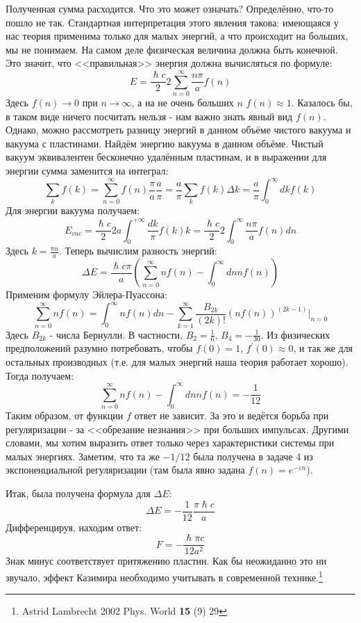\documentclass[a4paper,12pt]{article}
\begin{document}
\noindent
Полученная сумма расходится. Что это может означать? Определённо, что-то пошло не так. Стандартная интерпретация этого явления такова: имеющаяся у нас теория применима только для малых энергий, а что происходит на больших, мы не понимаем. На самом деле физическая величина должна быть конечной. Это значит, что <<правильная>> энергия должна вычисляться по формуле:
$$
E=\frac{\hslash c}{2}2\sum_{n=0}^{\infty}\frac{n\pi}{a}f(n)
$$
Здесь $f(n)\to0$ при $n\to\infty$, а на не очень больших $n$ $f(n)\approx1$. Казалось бы, в таком виде ничего посчитать нельзя - нам важно знать явный вид $f(n)$. Однако, можно рассмотреть разницу энергий в данном объёме чистого вакуума и вакуума с пластинами. Найдём энергию вакуума в данном объёме. Чистый вакуум эквивалентен бесконечно удалённым пластинам, и в выражении для энергии сумма заменится на интеграл:
$$
\sum_{k}f(k)=\sum_{n=0}^{\infty}f(n)\frac{\pi}{a}\frac{a}{\pi}=\frac{a}{\pi}\sum_{k}f(k)\Delta k=\frac{a}{\pi}\int_0^{\infty}dkf(k)
$$
Для энергии вакуума получаем:
$$
E_{vac}=\frac{\hslash c}{2}2 a\int_{0}^{+\infty}\frac{dk}{\pi}f(k)k= \frac{\hslash c}{2}2\int_0^{\infty}\frac{n\pi}{a}f(n)dn
$$
Здесь $k=\frac{\pi n}{a}$. 
Теперь вычислим разность энергий:
$$
\Delta E=\frac{\hslash c\pi}{a}\left(\sum_{n=0}^{\infty}nf(n)-\int_0^{\infty}dn nf(n)\right)
$$
Применим формулу Эйлера-Пуассона:
$$
\sum_{n=0}^{\infty}nf(n)=\int_{0}^{\infty}nf(n)dn-\sum_{k=1}^{\infty}\frac{B_{2k}}{(2k)!}\left(nf(n)\right)^{(2k-1)}\vert_{n=0}
$$
Здесь $B_{2k}$ - числа Бернулли. В частности, $B_2=\frac{1}{6}$, $B_4=-\frac{1}{30}$. Из физических предположений разумно потребовать, чтобы $f(0)=1$, $f^{'}(0)\approx0$, и так же для остальных производных (т.е. для малых энергий наша теория работает хорошо). Тогда получаем:
$$
\sum_{n=0}^{\infty}nf(n)-\int_0^{\infty}dn nf(n)=-\frac{1}{12}
$$
Таким образом, от функции $f$ ответ не зависит. За это и ведётся борьба при регуляризации - за <<обрезание незнания>> при больших импульсах. Другими словами, мы хотим выразить ответ только через характеристики системы при малых энергиях. Заметим, что та же $-1/12$ была получена в задаче 4 из экспоненциальной регуляризации (там была явно задана $f(n)=e^{-\varepsilon n}$).

\noindent
Итак, была получена формула для $\Delta E$:
$$
\Delta E=-\frac{1}{12}\frac{\pi\hslash c}{a}
$$
Дифференцируя, находим ответ:
$$
F=-\frac{\hslash\pi c}{12 a^2}
$$
Знак минус соответствует притяжению пластин. Как бы неожиданно это ни звучало, эффект Казимира необходимо учитывать в современной технике.\footnote{Astrid Lambrecht 2002 Phys. World \textbf{15} (9) 29}
\end{document}
